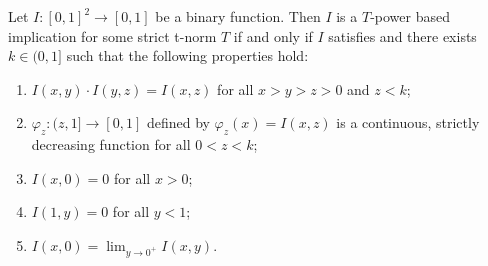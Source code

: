 \begin{proposition}
	Let $I: [0,1]^2 \to [0,1]$ be a binary function. Then $I$ is a $T$-power based implication for some strict t-norm $T$ if and only if $I$ satisfies \OP and there exists $k \in (0,1]$ such that the following properties hold:
	\begin{enumerate}[label=(\roman*)]
		\item $I(x,y) \cdot I(y,z) = I(x,z)$ for all $x>y>z>0$ and $z<k$;
		\item $\varphi_z : (z,1] \to [0,1]$ defined by $\varphi_z(x)=I(x,z)$ is a continuous, strictly decreasing function for all $0<z<k$;
		\item $I(x,0)=0$ for all $x>0$;
		\item $I(1,y)=0$ for all $y<1$;
		\item $\displaystyle I(x,0)=\lim_{y \to 0^+}I(x,y)$.
	\end{enumerate}
\end{proposition}









 